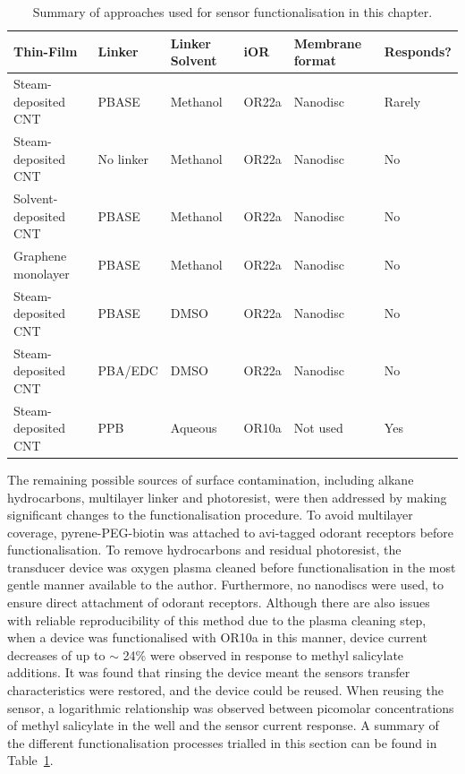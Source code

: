 \documentclass[
  a4paper,
]{scrbook}
\begin{document}
\hypertarget{tbl-method-summary}{}
\begin{longtable}[t]{>{\raggedright\arraybackslash}p{4.5cm}>{\raggedright\arraybackslash}p{1.6cm}>{\raggedright\arraybackslash}p{1.6cm}>{\raggedright\arraybackslash}p{1cm}>{\raggedright\arraybackslash}p{1.5cm}l}
\caption{\label{tbl-method-summary}Summary of approaches used for sensor functionalisation in this chapter. }\tabularnewline

\toprule
Thin-Film & Linker & Linker Solvent & iOR & Membrane format & Responds?\\
\midrule
Steam-deposited CNT & PBASE & Methanol & OR22a & Nanodisc & Rarely\\
Steam-deposited CNT & No linker & Methanol & OR22a & Nanodisc & No\\
Solvent-deposited CNT & PBASE & Methanol & OR22a & Nanodisc & No\\
Graphene monolayer & PBASE & Methanol & OR22a & Nanodisc & No\\
Steam-deposited CNT & PBASE & DMSO & OR22a & Nanodisc & No\\
\addlinespace
Steam-deposited CNT & PBA/EDC & DMSO & OR22a & Nanodisc & No\\
Steam-deposited CNT & PPB & Aqueous & OR10a & Not used & Yes\\
\bottomrule
\end{longtable}

The remaining possible sources of surface contamination, including
alkane hydrocarbons, multilayer linker and photoresist, were then
addressed by making significant changes to the functionalisation
procedure. To avoid multilayer coverage, pyrene-PEG-biotin was attached
to avi-tagged odorant receptors before functionalisation. To remove
hydrocarbons and residual photoresist, the transducer device was oxygen
plasma cleaned before functionalisation in the most gentle manner
available to the author. Furthermore, no nanodiscs were used, to ensure
direct attachment of odorant receptors. Although there are also issues
with reliable reproducibility of this method due to the plasma cleaning
step, when a device was functionalised with OR10a in this manner, device
current decreases of up to \(\sim\) 24\% were observed in response to
methyl salicylate additions. It was found that rinsing the device meant
the sensors transfer characteristics were restored, and the device could
be reused. When reusing the sensor, a logarithmic relationship was
observed between picomolar concentrations of methyl salicylate in the
well and the sensor current response. A summary of the different
functionalisation processes trialled in this section can be found in
Table~\ref{tbl-method-summary}.
\end{document}
